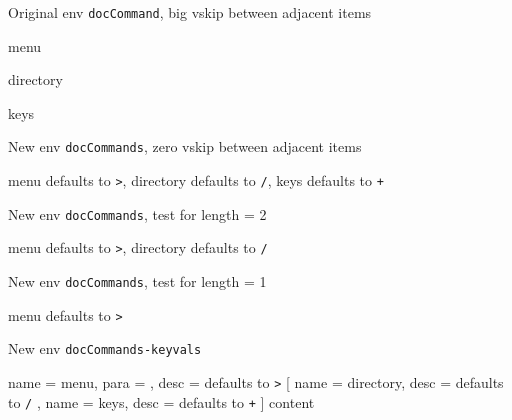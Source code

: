 \documentclass{article}
\begin{document}
\begin{example}{Original env \Verb|docCommand|, big vskip between adjacent items}
  
  \begin{docCommand}
    [doc description=\oarg{input sep} defaults to \Verb|>|]
    {menu}
    {}
  \end{docCommand}
  \begin{docCommand}{directory}{}
  \end{docCommand}
  \begin{docCommand}{keys}{}
    \lipsum[23]
  \end{docCommand}
\end{example}


\begin{example}{New env \Verb|docCommands|, zero vskip between adjacent items}
  \begin{docCommands}{
    {menu}
      {}
      { defaults to \Verb|>|},
    {directory}
      {}
      { defaults to \Verb|/|},
    {keys}
      {}
      { defaults to \Verb|+|}}
    \lipsum[23]
  \end{docCommands}
\end{example}

\begin{example}{New env \Verb|docCommands|, test for length = 2}
  \begin{docCommands}{
    {menu}
      {}
      { defaults to \Verb|>|},
    {directory}
      {}
      { defaults to \Verb|/|}}
    \lipsum[23]
  \end{docCommands}
\end{example}

\begin{example}{New env \Verb|docCommands|, test for length = 1}
  \begin{docCommands}{
    {menu}
      {}
      { defaults to \Verb|>|}}
    \lipsum[23]
  \end{docCommands}
\end{example}


\begin{example}{New env \Verb|docCommands-keyvals|}
  \begin{docCommands-keyvals}
    {
      name = menu,
      para = ,
      desc =  defaults to \Verb|>|
    }
    [
      {
        name = directory,
        desc =  defaults to \Verb|/|
      },
      {
        name = keys,
        desc =  defaults to \Verb|+|
      }
    ]
    content
  \end{docCommands-keyvals}
\end{example}
\end{document}
